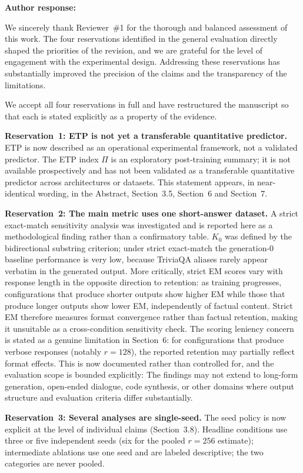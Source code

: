 \documentclass[11pt,a4paper]{article}
\newcommand{\newtext}[1]{#1}
\newcommand{\arhead}[1]{\medskip\noindent\textbf{#1}\par\smallskip}
\newcommand{\newtext}[1]{\textcolor{chgcolor}{``#1''}}
\begin{document}
\arhead{Author response:}
We sincerely thank Reviewer~\#1 for the thorough and balanced assessment of this work. The four reservations identified in the general evaluation directly shaped the priorities of the revision, and we are grateful for the level of engagement with the experimental design. Addressing these reservations has substantially improved the precision of the claims and the transparency of the limitations.

We accept all four reservations in full and have restructured the
manuscript so that each is stated explicitly as a property of the evidence.

\textbf{Reservation~1: ETP is not yet a transferable quantitative predictor.}
ETP is now described as an operational experimental framework, not a
validated predictor. \newtext{The ETP index $\Pi$ is an exploratory
post-training summary; it is not available prospectively and has not been
validated as a transferable quantitative predictor across architectures or
datasets.} This statement appears, in near-identical wording, in the Abstract, Section~3.5, Section~6 and Section~7.

\textbf{Reservation~2: The main metric uses one short-answer dataset.}
A strict exact-match sensitivity analysis was investigated and is reported
here as a methodological finding rather than a confirmatory table.
$K_0$ was defined by the bidirectional substring criterion; under strict
exact-match the generation-0 baseline performance is very low, because
TriviaQA aliases rarely appear verbatim in the generated output. More
critically, strict EM scores vary with response length in the opposite
direction to retention: as training progresses, configurations that produce
shorter outputs show higher EM while those that produce longer outputs show
lower EM, independently of factual content. Strict EM therefore measures
format convergence rather than factual retention, making it unsuitable as
a cross-condition sensitivity check. The scoring leniency concern is stated
as a genuine limitation in Section~6: for configurations that produce verbose
responses (notably $r=128$), the reported retention may partially reflect
format effects. This is now documented rather than controlled for, and the
evaluation scope is bounded explicitly: \newtext{The findings may not extend to long-form generation, open-ended dialogue, code synthesis, or other domains where output structure and evaluation criteria differ substantially.}

\textbf{Reservation~3: Several analyses are single-seed.}
The seed policy is now explicit at the level of individual claims
(Section~3.8). Headline conditions use three or five independent seeds
(six for the pooled $r=256$ estimate);
intermediate ablations use one seed and are labeled descriptive; the two
categories are never pooled.
\end{document}

